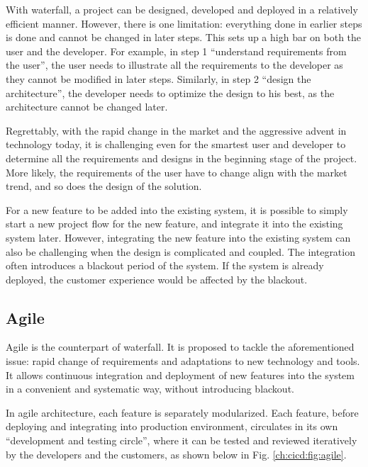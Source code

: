 With waterfall, a project can be designed, developed and deployed in a relatively efficient manner. However, there is one limitation: everything done in earlier steps is done and cannot be changed in later steps. This sets up a high bar on both the user and the developer. For example, in step 1 ``understand requirements from the user'', the user needs to illustrate all the requirements to the developer as they cannot be modified in later steps. Similarly, in step 2 ``design the architecture'', the developer needs to optimize the design to his best, as the architecture cannot be changed later.

Regrettably, with the rapid change in the market and the aggressive advent in technology today, it is challenging even for the smartest user and developer to determine all the requirements and designs in the beginning stage of the project. More likely, the requirements of the user have to change align with the market trend, and so does the design of the solution.

For a new feature to be added into the existing system, it is possible to simply start a new project flow for the new feature, and integrate it into the existing system later. However, integrating the new feature into the existing system can also be challenging when the design is complicated and coupled. The integration often introduces a blackout period of the system. If the system is already deployed, the customer experience would be affected by the blackout.

\subsection{Agile}

Agile is the counterpart of waterfall. It is proposed to tackle the aforementioned issue: rapid change of requirements and adaptations to new technology and tools. It allows continuous integration and deployment of new features into the system in a convenient and systematic way, without introducing blackout.

In agile architecture, each feature is separately modularized. Each feature, before deploying and integrating into production environment, circulates in its own “development and testing circle”, where it can be tested and reviewed iteratively by the developers and the customers, as shown below in Fig. \ref{ch:cicd:fig:agile}.

